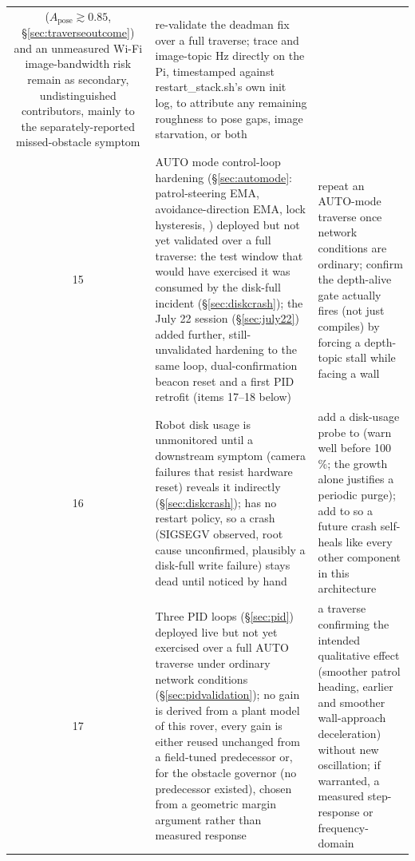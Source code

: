 \begin{longtable}{@{}cL{6.2cm}L{6.8cm}@{}}
    ($A_{\text{pose}}\gtrsim 0.85$, \S\ref{sec:traverseoutcome}) and an
    unmeasured Wi-Fi image-bandwidth risk remain as secondary, undistinguished
    contributors, mainly to the separately-reported missed-obstacle symptom &
    re-validate the deadman fix over a full traverse; trace
     and image-topic Hz directly on the Pi, timestamped
    against restart\_stack.sh's own init log, to attribute any remaining
    roughness to pose gaps, image starvation, or both \\
15 & AUTO mode control-loop hardening (\S\ref{sec:automode}: patrol-steering
    EMA, avoidance-direction EMA, lock hysteresis, )
    deployed but not yet validated over a full traverse: the test window
    that would have exercised it was consumed by the disk-full incident
    (\S\ref{sec:diskcrash}); the July 22 session (\S\ref{sec:july22}) added
    further, still-unvalidated hardening to the same loop, dual-confirmation
    beacon reset and a first PID retrofit (items 17--18 below) &
    repeat an AUTO-mode traverse once network conditions are ordinary;
    confirm the depth-alive gate actually fires (not just compiles) by
    forcing a depth-topic stall while facing a wall \\
16 & Robot disk usage is unmonitored until a downstream symptom (camera
    failures that resist hardware reset) reveals it indirectly
    (\S\ref{sec:diskcrash});  has no restart policy, so a
    crash (SIGSEGV observed, root cause unconfirmed, plausibly a
    disk-full write failure) stays dead until noticed by hand &
    add a disk-usage probe to  (warn well before
    100\,\%; the  growth alone justifies a periodic
    purge); add  to  so a future
    crash self-heals like every other component in this architecture \\
17 & Three PID loops (\S\ref{sec:pid}) deployed live but not yet exercised
    over a full AUTO traverse under ordinary network conditions
    (\S\ref{sec:pidvalidation}); no gain is derived from a plant model of
    this rover, every gain is either reused unchanged from a field-tuned
    predecessor or, for the obstacle governor (no predecessor existed),
    chosen from a geometric margin argument rather than measured response &
    a traverse confirming the intended qualitative effect (smoother patrol
    heading, earlier and smoother wall-approach deceleration) without new
    oscillation; if warranted, a measured step-response or frequency-domain

\end{longtable}
